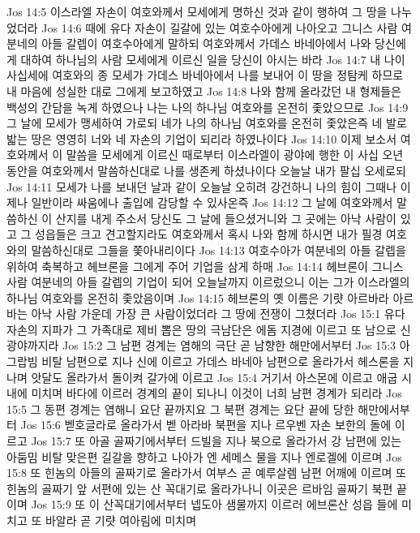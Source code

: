 Jos 14:5  이스라엘 자손이 여호와께서 모세에게 명하신 것과 같이 행하여 그 땅을 나누었더라
Jos 14:6  때에 유다 자손이 길갈에 있는 여호수아에게 나아오고 그니스 사람 여분네의 아들 갈렙이 여호수아에게 말하되 여호와께서 가데스 바네아에서 나와 당신에게 대하여 하나님의 사람 모세에게 이르신 일을 당신이 아시는 바라
Jos 14:7  내 나이 사십세에 여호와의 종 모세가 가데스 바네아에서 나를 보내어 이 땅을 정탐케 하므로 내 마음에 성실한 대로 그에게 보고하였고
Jos 14:8  나와 함께 올라갔던 내 형제들은 백성의 간담을 녹게 하였으나 나는 나의 하나님 여호와를 온전히 좇았으므로
Jos 14:9  그 날에 모세가 맹세하여 가로되 네가 나의 하나님 여호와를 온전히 좇았은즉 네 발로 밟는 땅은 영영히 너와 네 자손의 기업이 되리라 하였나이다
Jos 14:10  이제 보소서 여호와께서 이 말씀을 모세에게 이르신 때로부터 이스라엘이 광야에 행한 이 사십 오년 동안을 여호와께서 말씀하신대로 나를 생존케 하셨나이다 오늘날 내가 팔십 오세로되
Jos 14:11  모세가 나를 보내던 날과 같이 오늘날 오히려 강건하니 나의 힘이 그때나 이제나 일반이라 싸움에나 출입에 감당할 수 있사온즉
Jos 14:12  그 날에 여호와께서 말씀하신 이 산지를 내게 주소서 당신도 그 날에 들으셨거니와 그 곳에는 아낙 사람이 있고 그 성읍들은 크고 견고할지라도 여호와께서 혹시 나와 함께 하시면 내가 필경 여호와의 말씀하신대로 그들을 쫓아내리이다
Jos 14:13  여호수아가 여분네의 아들 갈렙을 위하여 축복하고 헤브론을 그에게 주어 기업을 삼게 하매
Jos 14:14  헤브론이 그니스 사람 여분네의 아들 갈렙의 기업이 되어 오늘날까지 이르렀으니 이는 그가 이스라엘의 하나님 여호와를 온전히 좇았음이며
Jos 14:15  헤브론의 옛 이름은 기럇 아르바라 아르바는 아낙 사람 가운데 가장 큰 사람이었더라 그 땅에 전쟁이 그쳤더라
Jos 15:1  유다 자손의 지파가 그 가족대로 제비 뽑은 땅의 극남단은 에돔 지경에 이르고 또 남으로 신 광야까지라
Jos 15:2  그 남편 경계는 염해의 극단 곧 남향한 해만에서부터
Jos 15:3  아그랍빔 비탈 남편으로 지나 신에 이르고 가데스 바네아 남편으로 올라가서 헤스론을 지나며 앗달도 올라가서 돌이켜 갈가에 이르고
Jos 15:4  거기서 아스몬에 이르고 애굽 시내에 미치며 바다에 이르러 경계의 끝이 되나니 이것이 너희 남편 경계가 되리라
Jos 15:5  그 동편 경계는 염해니 요단 끝까지요 그 북편 경계는 요단 끝에 당한 해만에서부터
Jos 15:6  벧호글라로 올라가서 벧 아라바 북편을 지나 르우벤 자손 보한의 돌에 이르고
Jos 15:7  또 아골 골짜기에서부터 드빌을 지나 북으로 올라가서 강 남편에 있는 아둠밈 비탈 맞은편 길갈을 향하고 나아가 엔 세메스 물을 지나 엔로겔에 이르며
Jos 15:8  또 힌놈의 아들의 골짜기로 올라가서 여부스 곧 예루살렘 남편 어깨에 이르며 또 힌놈의 골짜기 앞 서편에 있는 산 꼭대기로 올라가나니 이곳은 르바임 골짜기 북편 끝이며
Jos 15:9  또 이 산꼭대기에서부터 넵도아 샘물까지 이르러 에브론산 성읍 들에 미치고 또 바알라 곧 기럇 여아림에 미치며
